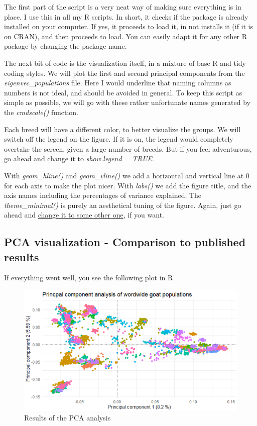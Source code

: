 \documentclass[]{book}
\begin{document}
The first part of the script is a very neat way of making sure
everything is in place. I use this in all my R scripts. In short, it
checks if the package is already installed on your computer. If yes, it
proceeds to load it, in not installs it (if it is on CRAN), and then
proceeds to load. You can easily adapt it for any other R package by
changing the package name.

The next bit of code is the visualization itself, in a mixture of base R
and tidy coding styles. We will plot the first and second principal
components from the \emph{eigenvec\_populations} file. Here I would
underline that naming columns as numbers is not ideal, and should be
avoided in general. To keep this script as simple as possible, we will
go with these rather unfortunate names generated by the
\emph{cmdscale()} function.

Each breed will have a different color, to better visualize the groups.
We will switch off the legend on the figure. If it is on, the legend
would completely overtake the screen, given a large number of breeds.
But if you feel adventurous, go ahead and change it to \emph{show.legend
= TRUE}.

With \emph{geom\_hline()} and \emph{geom\_vline()} we add a horizontal
and vertical line at 0 for each axis to make the plot nicer. With
\emph{labs()} we add the figure title, and the axis names including the
percentages of variance explained. The \emph{theme\_minimal()} is purely
an aesthetical tuning of the figure. Again, just go ahead and
\href{https://ggplot2.tidyverse.org/reference/ggtheme.html}{change it to
some other one}, if you want.

\subsection{PCA visualization - Comparison to published
results}\label{pca-visualization---comparison-to-published-results}

If everything went well, you see the following plot in R

\begin{figure}
\includegraphics[width=8.68in]{images/9-1-resultsPcaGoats} \caption{Results of the PCA analysis}\label{fig:fig9-1}
\end{figure}
\end{document}
